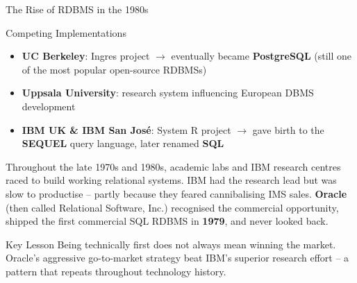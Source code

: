 \begin{frame}{The Rise of RDBMS in the 1980s}
  \begin{block}{Competing Implementations}
    \begin{itemize}
      \item \textbf{UC Berkeley}: Ingres project $\rightarrow$ eventually became
            \textbf{PostgreSQL} (still one of the most popular open-source RDBMSs)
      \item \textbf{Uppsala University}: research system influencing European DBMS development
      \item \textbf{IBM UK \& IBM San José}: System R project
            $\rightarrow$ gave birth to the \textbf{SEQUEL} query language,
            later renamed \textbf{SQL}
    \end{itemize}
  \end{block}

  Throughout the late 1970s and 1980s, academic labs and IBM research centres
  raced to build working relational systems.  IBM had the research lead but was
  slow to productise -- partly because they feared cannibalising IMS sales.
  \textbf{Oracle} (then called Relational Software, Inc.) recognised the
  commercial opportunity, shipped the first commercial SQL RDBMS in
  \textbf{1979}, and never looked back.

  \begin{alertblock}{Key Lesson}
    Being technically first does not always mean winning the market.  Oracle's
    aggressive go-to-market strategy beat IBM's superior research effort --
    a pattern that repeats throughout technology history.
  \end{alertblock}
\end{frame}

